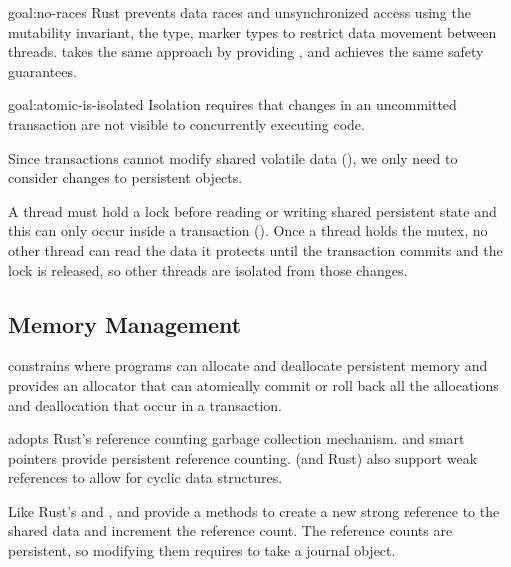 \begin{goaltrue}{goal:no-races}
  Rust prevents data races and unsynchronized access using the mutability
  invariant, the  type, marker types to restrict data movement between threads.
  \This{} takes the same approach by providing , and achieves the
  same safety guarantees.
  
\end{goaltrue}

\begin{goaltrue}{goal:atomic-is-isolated}
  Isolation requires that changes in an uncommitted transaction are not visible
  to concurrently executing code.

  Since transactions cannot modify shared volatile data
  (), we only need to consider changes to
  persistent objects.

  A thread must hold a lock before reading or writing shared persistent state
  and this can only occur inside a transaction
  ().  Once a thread holds the mutex, no other
  thread can read the data it protects until the transaction commits and the lock is released, so other threads are isolated from
  those changes.
\end{goaltrue}

\subsection{Memory Management}

\This{} constrains where programs can allocate and deallocate persistent memory
and provides an allocator that can atomically commit or roll back all the
allocations and deallocation that occur in a transaction.

\This{} adopts Rust's reference counting garbage collection mechanism.
 and  smart pointers provide
 persistent reference counting.  \This{} (and Rust)
also support weak references to allow for cyclic data structures.

Like Rust's  and ,   and  provide
a  methods to create a new strong reference to the shared data and
increment the reference count.  The reference counts are persistent, so
modifying them requires  to take a journal object.

